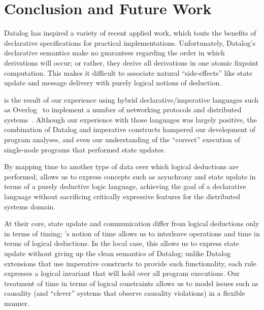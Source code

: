 \section{Conclusion and Future Work}

Datalog has inspired a variety of recent applied work, which touts the benefits of declarative specifications for practical implementations.  Unfortunately, Datalog's declarative semantics make no guarantees
regarding the order in which derivations will occur; or rather, they derive all derivations in one atomic fixpoint computation.  This makes it difficult to associate natural ``side-effects'' like state update and message delivery with purely logical notions of deduction.


\lang is the result of our experience using hybrid declarative/imperative languages such as
Overlog~\cite{Loo2009-CACM} to implement a number of networking protocols
and distributed systems~\cite{boom-techr,Loo2009-CACM,Alvaro2009I-Do-Declare:-C,Chu:2007}.  Although our experience with those
languages was largely positive, the combination of Datalog and imperative constructs hampered our development of program analyses, and even our understanding of the ``correct'' execution of single-node programs that performed state updates.


By mapping time to another type of data over which logical deductions
are performed, \lang allows us to express concepts such as asynchrony and state update in terms of a purely deductive logic
language, achieving the goal of a declarative language without sacrificing critically expressive features for the distributed systems domain.

At their core, state update and communication differ from logical
deductions only in terms of timing; \lang's notion of time allows us
to interleave operations and time in terms of logical deductions.
In the local case, this allows us to express state update without giving up the clean semantics of Datalog; unlike
Datalog extensions that use imperative constructs to provide such
functionality, each \lang rule expresses a logical invariant that will
hold over all program executions.  
Our treatment of time in terms of
logical constraints allows us to model issues such as causality (and
``clever'' systems that observe causality violations) in a flexible
manner.

